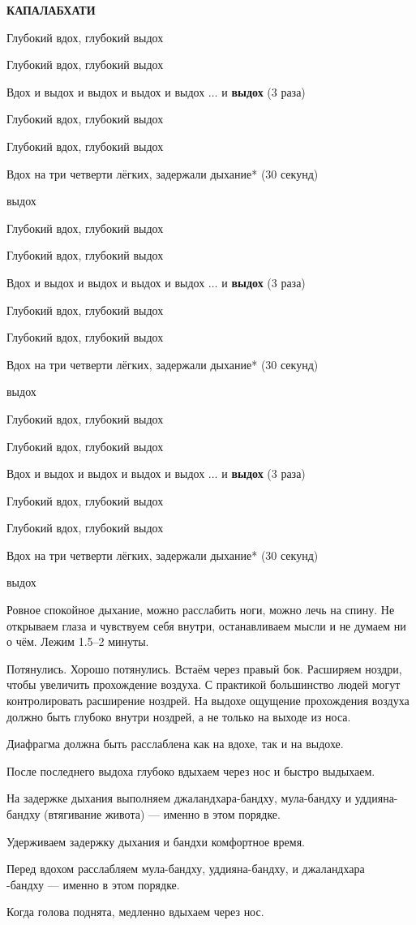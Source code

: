 \pdfhorigin=15mm \hsize=180mm
\pdfvorigin=15mm \vsize=267mm
\nopagenumbers
\def\cycle{
  Глубокий вдох, глубокий выдох \par
  Глубокий вдох, глубокий выдох \par
  Вдох и выдох и выдох и выдох и выдох $\ldots$ и {\bf выдох} (3 раза) \par
  Глубокий вдох, глубокий выдох \par
  Глубокий вдох, глубокий выдох \par
  Вдох на три четверти лёгких, задержали дыхание* (30 секунд)\par
  выдох \par}
\parindent=0pt
\parskip=7pt
\centerline{\bf КАПАЛАБХАТИ}
\bigskip
\cycle
\cycle
\cycle
Ровное спокойное дыхание, можно расслабить ноги, можно лечь на спину.
Не открываем глаза и чувствуем себя внутри, останавливаем мысли и не думаем ни о чём.
Лежим 1.5--2 минуты. \par
Потянулись. Хорошо потянулись. Встаём через правый бок.
\vfil\eject
\parskip=0pt
Расширяем ноздри, чтобы увеличить прохождение воздуха. С практикой большинство людей могут
контролировать расширение ноздрей. На выдохе ощущение прохождения воздуха должно быть глубоко
внутри ноздрей, а не только на выходе из носа.

Диафрагма должна быть расслаблена как на вдохе, так и на выдохе.

После последнего выдоха глубоко вдыхаем через нос и быстро выдыхаем.

На задержке дыхания выполняем джаландхара-бандху, мула-бандху и уддияна-бандху
(втягивание живота) --- именно в этом порядке.

Удерживаем задержку дыхания и бандхи комфортное время.

Перед вдохом расслабляем мула-бандху, уддияна-бандху, и джаландхара\\-бандху --- именно в
этом порядке.

Когда голова поднята, медленно вдыхаем через нос.

\bye
